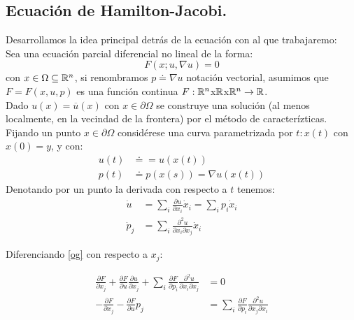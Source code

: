\subsection{Ecuación de Hamilton-Jacobi.}
Desarrollamos la idea principal detr\'as de la ecuaci\'on con al que trabajaremo:\\
Sea una ecuaci\'on parcial diferencial no lineal \citep{evans} de la forma:
\begin{equation}\label{og}
	F(x;u,\nabla u)=0
\end{equation}
con $x\in\Omega\subseteq\mathbb{R}^n$, si renombramos $p\doteq\nabla u$ notaci\'on vectorial, asumimos que $F=F(x,u,p)$ es una funci\'on continua $F:\mathbb{R}^n$x$\mathbb{R}$x$\mathbb{R}^n \to \mathbb{R}$.\\
Dado $u(x)=\overline{u}(x)$ con $x\in\partial\Omega$ se construye una soluci\'on (al menos localmente, en la vecindad de la frontera) por el m\'etodo de caracter\'izticas.
Fijando un punto $x\in\partial\Omega$ consid\'erese una curva parametrizada por $t:x(t)$ con $x(0)=y$, y con:
\begin{equation*}
	\begin{split}
		u(t)&\doteq=u(x(t))\\
		p(t)&\doteq p(x(s))=\nabla u(x(t))
	\end{split}
\end{equation*}
Denotando por un punto la derivada con respecto a $t$ tenemos:
\begin{equation}\label{casi}
	\begin{split}
		\dot{u}&=\sum_i \frac{\partial u}{\partial x_i}\dot x_i=\sum_i p_i \dot x_i\\
		\dot p_j&=\sum_i \frac{\partial^2 u}{\partial x_i\partial x_j} \dot x_i
	\end{split}
\end{equation}

Diferenciando \eqref{og} con respecto a $x_j$:

\begin{equation*}
	\begin{split}
		\frac{\partial F}{\partial x_j}+\frac{\partial F}{\partial u}\frac{\partial u}{\partial x_j}+\sum_i \frac{\partial F}{\partial p_i}\frac{\partial^2 u}{\partial x_i\partial x_j}&=0\\
		-\frac{\partial F}{\partial x_j}-\frac{\partial F}{\partial u}p_j&=\sum_i \frac{\partial F}{\partial p_i}\frac{\partial^2 u}{\partial x_j\partial x_i}
	\end{split}
\end{equation*}

